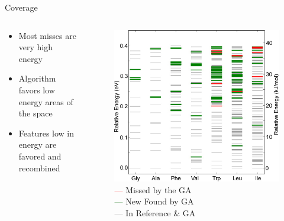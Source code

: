 \documentclass[10pt]{beamer}
\begin{document}
{{%
\begin{frame}{Coverage}
	\begin{columns}[c] %
		\begin{column}{.4\textwidth}
			\begin{itemize}[<+->]
				\item {Most misses are very high energy}
				\item {Algorithm favors low energy areas of the space}
				\item {Features low in energy are favored and recombined}
			\end{itemize}
		\end{column}
		\hfill
		\begin{column}{0.6\textwidth}
			\begin{figure}
				\includegraphics[width=0.75\linewidth]{images/Supady5.png}
				\caption*{\textcolor{red}{---} Missed by the GA \\
				  \textcolor{darkgreen}{---} New Found by GA \\
				  \textcolor{gray}{---} In Reference \& GA}
			\end{figure}
		\end{column}
	\end{columns}
\end{frame}
}

}
\end{document}
